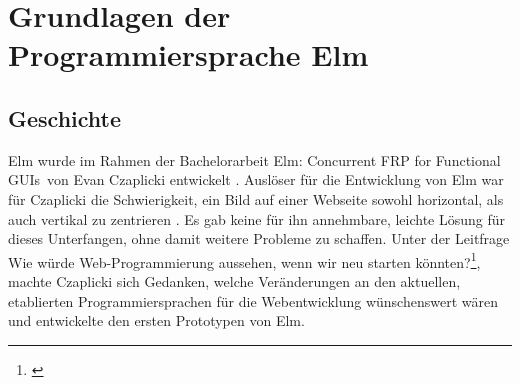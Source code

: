 \section{Grundlagen der Programmiersprache Elm}
\label{sec:grundlagen-programmiersprache-elm}

\subsection{Geschichte}
\label{sec:Geschichte}
Elm wurde im Rahmen der Bachelorarbeit \glqq Elm: Concurrent FRP for Functional GUIs\grqq~von Evan Czaplicki entwickelt \cite[Vgl.]{evan-thesis}.
Auslöser für die Entwicklung von Elm war für Czaplicki die Schwierigkeit, ein Bild auf einer Webseite sowohl horizontal, als auch vertikal zu zentrieren \cite[Vgl.]{evan-center}. Es gab keine für ihn annehmbare, leichte Lösung für dieses Unterfangen, ohne damit weitere Probleme zu schaffen. Unter der Leitfrage \glqq Wie würde Web-Programmierung aussehen, wenn wir neu starten könnten?\grqq\footnote{\cite[Vgl. Eigene Übersetzung]{web-programming-restarted}}, machte Czaplicki sich Gedanken, welche Veränderungen an den aktuellen, etablierten Programmiersprachen für die Webentwicklung wünschenswert wären und entwickelte den ersten Prototypen von Elm.

